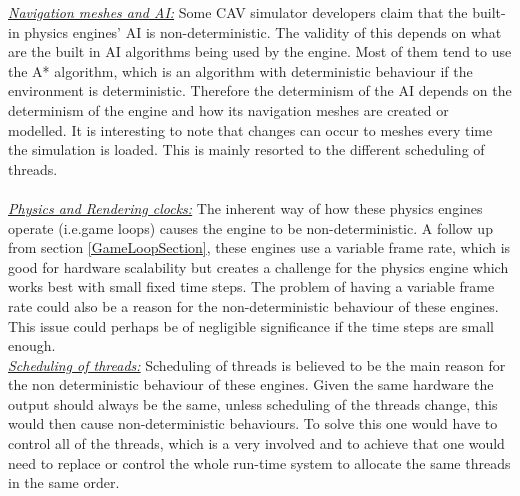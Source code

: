 \noindent\underline{\textit{Navigation meshes and AI:}}
Some CAV simulator developers claim that the built-in physics engines' AI is non-deterministic\cite{CARLABenchmark}. 
The validity of this depends on what are the built in AI algorithms being used by the engine. 
Most of them tend to use the A* algorithm\cite{AStarBook}, which is an algorithm with deterministic behaviour if the environment is deterministic\cite{AirsimUnrealArticle}\cite{UnrealAIDocumentation}. 
Therefore the determinism of the AI depends on the determinism of the engine and how its navigation meshes are created or modelled. It is interesting to note that changes can occur to meshes every time the simulation is loaded. This is mainly resorted to the different scheduling of threads. \\\\
\noindent\underline{\textit{Physics and Rendering clocks:}}
The inherent way of how these physics engines operate (i.e.game loops) causes the engine to be non-deterministic. 
A follow up from section \ref{GameLoopSection}, these engines use a variable frame rate, which is good for hardware scalability but creates a challenge for the physics engine which works best with small fixed time steps. 
The problem of having a variable frame rate could also be a reason for the non-deterministic behaviour of these engines. This issue could perhaps be of negligible significance if the time steps are small enough. \\

\noindent\underline{\textit{Scheduling of threads:}} Scheduling of threads is believed to be the main reason for the non deterministic behaviour of these engines. Given the same hardware the output should always be the same, unless scheduling of the threads change, this would then cause non-deterministic behaviours. To solve this one would have to control all of the threads, which is a very involved and to achieve that one would need to replace or control the whole run-time system to allocate the same threads in the same order.

